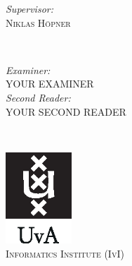 \documentclass[../main.tex]{subfiles}
\begin{document}
\begin{titlepage}
    \begin{minipage}[t]{0.4\textwidth}
        \begin{flushleft} \large
            \emph{Supervisor:} \\
            \textsc{Niklas Höpner}
        \end{flushleft}
    \end{minipage}
    ~
    \begin{minipage}[t]{0.4\textwidth}
        \begin{flushright} \large
            \emph{Examiner:} \\
            \textsc{YOUR EXAMINER} \\
            \vspace{0.5cm}
            \emph{Second Reader:} \\
            \textsc{YOUR SECOND READER}
        \end{flushright}
    \end{minipage}\\[2cm]

    \vfill %

    \includegraphics[width=2.5cm]{logos/uvalogo_tag_p.eps}\\[0.5cm]
    \textsc{\large Informatics Institute (IvI)}\\[1.0cm] %


\end{titlepage}
\end{document}
